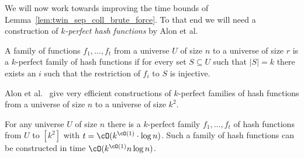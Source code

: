 We will now work towards improving the time bounds of Lemma~\ref{lem:twin_sep_coll_brute_force}. 
 To that end we will need a construction of {\em $k$-perfect hash functions} by Alon et al.~\cite{AlonYZ}
\begin{definition} 
A family of functions $f_1, \ldots, f_t$ from a universe $U$ of size $n$ to a universe of size $r$ is a $k$-perfect family of hash functions if for every set $S \subseteq U$ such that $|S|=k$ 
there exists an $i$ such that the restriction of $f_i$ to $S$ is injective.
\end{definition}
Alon et al.~\cite{AlonYZ} give very efficient constructions of $k$-perfect families of hash functions from a universe of size $n$ to a universe of size $k^2$.
\begin{proposition}\label{prop:hashFun} 
For any universe $U$ of size $n$ there is a $k$-perfect family $f_1, \ldots, f_t$ of hash functions from $U$ to 
$[k^2]$ 
with $t = \cO(k^{\cO(1)} \cdot \log n)$. 
Such a family of hash functions can be constructed in time $\cO(k^{\cO(1)}n \log n)$. 
\end{proposition}

